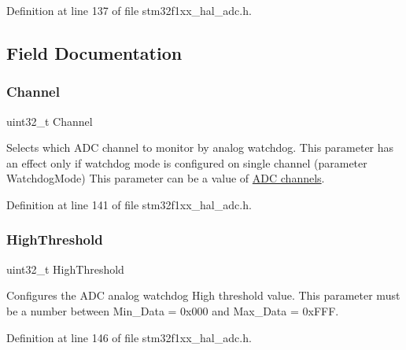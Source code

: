 Definition at line 137 of file stm32f1xx\+\_\+hal\+\_\+adc.\+h.



\subsection{Field Documentation}
\mbox{\label{struct_a_d_c___analog_w_d_g_conf_type_def_ae82bf9242a014164f9f6907f29782c44}} 
\subsubsection{\texorpdfstring{Channel}{Channel}}
{\footnotesize\ttfamily uint32\+\_\+t Channel}

Selects which A\+DC channel to monitor by analog watchdog. This parameter has an effect only if watchdog mode is configured on single channel (parameter Watchdog\+Mode) This parameter can be a value of \hyperlink{group___a_d_c__channels}{A\+DC channels}. 

Definition at line 141 of file stm32f1xx\+\_\+hal\+\_\+adc.\+h.

\mbox{\label{struct_a_d_c___analog_w_d_g_conf_type_def_a5c3a76d9a8ac84c537e7df10b0315e5a}} 
\subsubsection{\texorpdfstring{High\+Threshold}{HighThreshold}}
{\footnotesize\ttfamily uint32\+\_\+t High\+Threshold}

Configures the A\+DC analog watchdog High threshold value. This parameter must be a number between Min\+\_\+\+Data = 0x000 and Max\+\_\+\+Data = 0x\+F\+FF. 

Definition at line 146 of file stm32f1xx\+\_\+hal\+\_\+adc.\+h.

\mbox{\label{struct_a_d_c___analog_w_d_g_conf_type_def_adb9d0be5088ff9f6e0b5e4bbb9088904}} 

